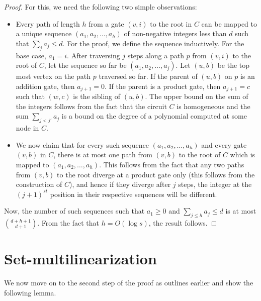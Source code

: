 \begin{proof}
For this, we need the following two simple observations:
\begin{itemize}
\item Every path of length $h$ from a gate $(v, i)$ to the root in $C$ can be mapped to a unique sequence $(a_1, a_2, \ldots, a_h)$ 
of non-negative integers less than $d$ such that $\sum_j a_j \leq d$. For the proof, we define the sequence inductively. For the base case, $a_1 = i$. After traversing $j$ steps along a path $p$ from $(v,i)$ to the root of $C$, let the sequence so far be $(a_1, a_2, \ldots, a_j)$. Let $(u, b)$ be the top most vertex on the path $p$ traversed so far. If  the parent of $(u, b)$ on $p$ is an addition gate, then $a_{j+1} = 0$. If the parent is a product gate, then $a_{j+1} = c$ such that $(w,c)$ is the sibling of $(u,b)$. The upper bound on the sum of the integers follows from the fact that the circuit $C$ is homogeneous and the sum $\sum_{j<j'} a_j$ is a bound on the degree of a polynomial computed at some node in $C$.

\item We now claim that for every such sequence $(a_1, a_2, \ldots, a_h)$ and every gate $(v,b)$ in $C$, there is at most one path from $(v,b)$ to the root of $C$ which is mapped to $(a_1, a_2, \ldots, a_h)$. This follows from the fact that any two paths from $(v,b)$ to the root diverge at a product gate only (this follows from the construction of $C$), and hence if they diverge after $j$ steps, the integer at the $(j+1)^{st}$ position in their respective sequences will be different.  
\end{itemize}

Now, the number of such sequences  such that $a_1 \geq 0$ and $\sum_{j \leq h}a_j \leq d$ is at most ${d + h + 1\choose d+1}$. From the fact that $h = O(\log s)$, the result follows. 
\end{proof}

\section{Set-multilinearization}
We now move on to the second step of the proof as outlines earlier and show the following lemma. 

